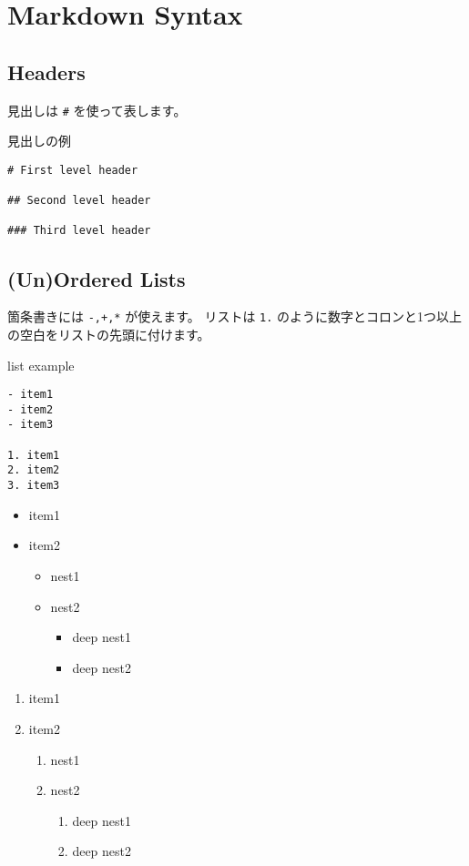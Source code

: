 \documentclass[a4j, titlepage]{jarticle}
\begin{document}
\section{Markdown Syntax}

\subsection{Headers}

見出しは {\tt \#} を使って表します。

\begin{itembox}[c]{見出しの例}
\begin{verbatim}
# First level header

## Second level header

### Third level header
\end{verbatim}
\end{itembox}

\subsection{(Un)Ordered Lists}

箇条書きには {\tt -,+,*} が使えます。
リストは {\tt 1.} のように数字とコロンと1つ以上の空白をリストの先頭に付けます。

\begin{itembox}[c]{list example}
\begin{verbatim}
- item1
- item2
- item3

1. item1
2. item2
3. item3
\end{verbatim}
\end{itembox}

\begin{itemize}
\item item1
\item item2


\begin{itemize}
\item nest1
\item nest2


\begin{itemize}
\item deep nest1
\item deep nest2
\end{itemize}
\end{itemize}
\end{itemize}

\begin{enumerate}
\item item1
\item item2


\begin{enumerate}
\item nest1
\item nest2


\begin{enumerate}
\item deep nest1
\item deep nest2
\end{enumerate}
\end{enumerate}
\end{enumerate}
\end{document}
